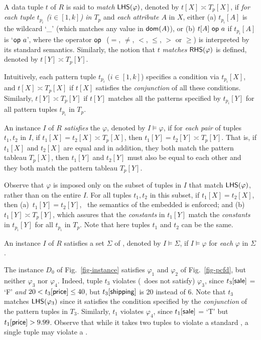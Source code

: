 A data tuple $t$ of $R$ is said to {\em match} ${\mathsf{LHS}}(\varphi)$,
denoted by $t[X] \asymp T_p[X]$, if {\em for each tuple
$t_{p_i}$ ($i\in[1, k]$) in $T_p$} and {\em each attribute $A$} in $X$, either
(a)  $t_{p_i}[A]$ is the wildcard `\_' (which matches any value
in $\protect\mathsf{dom}(A)$),  or
(b) $t[A]\ \op a$ if $t_{p_i}[A]$ is `$\op a$', where
the operator $\op$ ($=$, $\ne$,
$<$, $\le$, $>$ or $\ge$) is interpreted by its standard
semantics. Similarly, the notion that $t$ {\em matches} ${\mathsf{RHS}}(\varphi)$
is defined, denoted by $t[Y] \asymp T_p[Y]$.


Intuitively, each pattern tuple $t_{p_i}$ ($i\in[1, k]$) specifies a condition via
$t_{p_i}[X]$, and $t[X] \asymp T_p[X]$ if
 $t[X]$ satisfies the {\em conjunction} of all these conditions.
Similarly, $t[Y] \asymp T_p[Y]$ if $t[Y]$ matches all the patterns
specified by $t_{p_i}[Y]$ for all pattern tuples $t_{p_i}$ in $T_p$.

An instance $I$ of $R$ {\em satisfies} the \pCFD $\varphi$, denoted
by $I \models \varphi$, if  for {\em each pair} of tuples $t_1, t_2$
in $I$, if $t_1[X] = t_2[X] \asymp T_p[X]$, then
$t_1[Y] = t_2[Y] \asymp T_p[Y]$.  That is, if $t_1[X]$ and $t_2[X]$
are equal and in addition, they both match the pattern tableau
$T_p[X]$, then $t_1[Y]$ and $t_2[Y]$ must also be equal to each
other and they both match the pattern tableau $T_p[Y]$.

Observe that $\varphi$ is imposed only on the subset of tuples in
$I$ that match ${\mathsf{LHS}}(\varphi)$, rather than on the entire $I$. For
all tuples $t_1, t_2$ in this subset, if $t_1[X] = t_2[X]$, then
(a)~$t_1[Y] = t_2[Y]$, \ie~the semantics of the embedded \FDs is
enforced; and (b)~$t_1[Y] \asymp T_p[Y]$, which assures that the
{\em constants} in $t_1[Y]$ match the {\em constants} in $t_{p_i}[Y]$
for all $t_{p_i}$ in $T_p$. Note that here tuples $t_1$ and $t_2$ can
be the same.



An instance $I$ of $R$ satisfies a set $\Sigma$ of \pCFDs,
denoted by $I\models\Sigma$, if $I\models\varphi$ for {\em each}
\pCFD $\varphi$ in $\Sigma$.

\vspace{-1ex}
\begin{example}
The instance $D_0$ of
Fig.~\ref{fig-instance} satisfies $\varphi_1$ and $\varphi_2$ of
Fig.~\ref{fig-pcfd}, but neither $\varphi_3$ nor
$\varphi_4$. Indeed, tuple $t_3$ violates (\ie~does not satisfy)
$\varphi_3$, since
$t_3[\protect\mathsf{sale}]$ = `F' {\em and} $20 < t_3[\protect\mathsf{price}] \le 40$,
but $t_3[\protect\mathsf{shipping}]$ is 20 instead of $6$.
Note that $t_3$ matches ${\mathsf{LHS}}(\varphi_3)$ since it satisfies
the condition specified by the {\em conjunction}
of the pattern tuples in $T_3$.
Similarly, $t_1$ violates $\varphi_4$, since
$t_1[\protect\mathsf{sale}]$ = `T' but $t_1[\protect\mathsf{price}] > 9.99$.
Observe that while it takes two tuples
to violate a standard \FD, a single tuple may violate a
\pCFD.
\end{example}
\vspace{-1.5ex}

